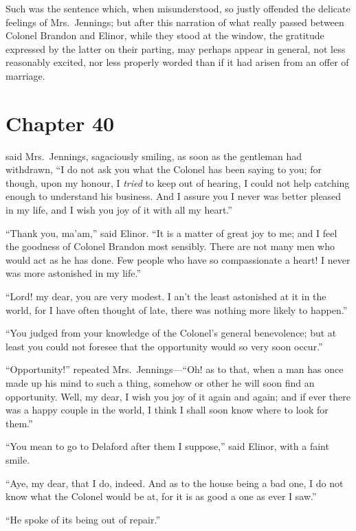 Such was the sentence which, when misunderstood,
so justly offended the delicate feelings of Mrs.\ Jennings;
but after this narration of what really passed between
Colonel Brandon and Elinor, while they stood at the window,
the gratitude expressed by the latter on their parting, may
perhaps appear in general, not less reasonably excited,
nor less properly worded than if it had arisen from
an offer of marriage.



\chapter{Chapter 40}


 said Mrs.\ Jennings,
sagaciously smiling, as soon as the gentleman had withdrawn,
``I do not ask you what the Colonel has been saying to you;
for though, upon my honour, I \emph{tried} to keep out of hearing,
I could not help catching enough to understand his business.
And I assure you I never was better pleased in my life,
and I wish you joy of it with all my heart.''

``Thank you, ma'am,'' said Elinor.  ``It is a matter
of great joy to me; and I feel the goodness of Colonel
Brandon most sensibly.  There are not many men who would
act as he has done.  Few people who have so compassionate
a heart!  I never was more astonished in my life.''

``Lord! my dear, you are very modest.  I an't the least
astonished at it in the world, for I have often thought
of late, there was nothing more likely to happen.''

``You judged from your knowledge of the Colonel's
general benevolence; but at least you could not foresee
that the opportunity would so very soon occur.''

``Opportunity!'' repeated Mrs.\ Jennings---``Oh! as to that,
when a man has once made up his mind to such a thing,
somehow or other he will soon find an opportunity.
Well, my dear, I wish you joy of it again and again;
and if ever there was a happy couple in the world, I think
I shall soon know where to look for them.''

``You mean to go to Delaford after them I suppose,''
said Elinor, with a faint smile.

``Aye, my dear, that I do, indeed.  And as to the house
being a bad one, I do not know what the Colonel would be at,
for it is as good a one as ever I saw.''

``He spoke of its being out of repair.''

